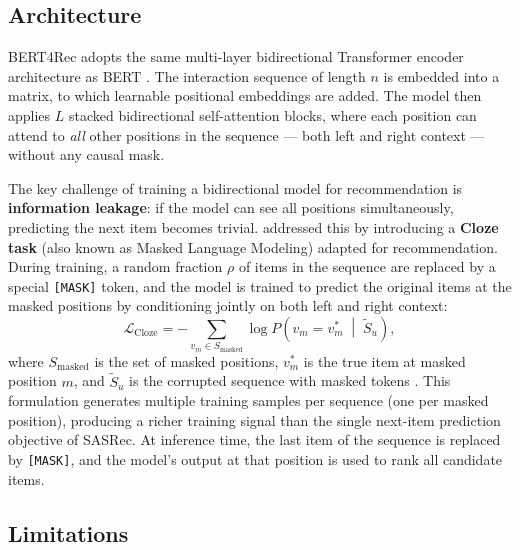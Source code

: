 \documentclass[12pt,a4paper]{report}
\newcommand{\textcite}[1]{\citet{#1}}
\newcommand{\parencite}[1]{\citep{#1}}
\begin{document}
\subsection{Architecture}

BERT4Rec adopts the same multi-layer bidirectional Transformer
encoder architecture as BERT \parencite{sun2019bert4rec}. The
interaction sequence of length $n$ is embedded into a matrix, to
which learnable positional embeddings are added. The model then
applies $L$ stacked bidirectional self-attention blocks, where
each position can attend to \textit{all} other positions in the
sequence --- both left and right context --- without any causal
mask.

The key challenge of training a bidirectional model for
recommendation is \textbf{information leakage}: if the model can
see all positions simultaneously, predicting the next item becomes
trivial. \textcite{sun2019bert4rec} addressed this by introducing
a \textbf{Cloze task} (also known as Masked Language Modeling)
adapted for recommendation. During training, a random fraction
$\rho$ of items in the sequence are replaced by a special
\texttt{[MASK]} token, and the model is trained to predict the
original items at the masked positions by conditioning jointly on
both left and right context:
\begin{equation}
  \mathcal{L}_{\text{Cloze}} =
    -\sum_{v_m \in S_{\text{masked}}}
      \log P\!\left( v_m = v_m^* \;\middle|\; \tilde{S}_u \right),
\end{equation}
where $S_{\text{masked}}$ is the set of masked positions,
$v_m^*$ is the true item at masked position $m$, and
$\tilde{S}_u$ is the corrupted sequence with masked tokens
\parencite{sun2019bert4rec}. This formulation generates multiple
training samples per sequence (one per masked position), producing
a richer training signal than the single next-item prediction
objective of SASRec. At inference time, the last item of the
sequence is replaced by \texttt{[MASK]}, and the model's output
at that position is used to rank all candidate items.

\subsection{Limitations}
\end{document}
